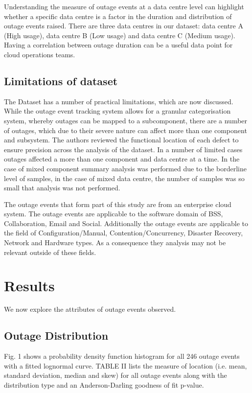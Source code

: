 \documentclass[conference]{IEEEtran}
\begin{document}
Understanding the measure of outage events at a data centre level can highlight whether a specific data centre is a factor in the duration and distribution of outage events raised. There are three data centres in our dataset: data centre A (High usage), data centre B (Low usage) and data centre C (Medium usage). Having a correlation between outage duration can be a useful data point for cloud operations teams.

\subsection{Limitations of dataset}

The Dataset has a number of practical limitations, which are now discussed. While the outage event tracking system allows for a granular categorisation system, whereby outages can be mapped to a subcomponent, there are a number of outages, which due to their severe nature can affect more than one component and subsystem. The authors reviewed the functional location of each defect to ensure precision across the analysis of the dataset. In a number of limited cases outages affected a more than  one component and data centre at a time. In the case of mixed component summary analysis was performed due to the borderline level of samples, in the case of mixed data centre, the number of samples was so small that analysis was not performed. \par

The outage events that form part of this study are from an enterprise cloud system. The outage events are applicable to the software domain of BSS, Collaboration, Email and Social. Additionally the outage events are applicable to the field of Configuration/Manual, Contention/Concurrency, Disaster Recovery, Network and Hardware types. As a consequence they analysis may not be relevant outside of these fields. 

\section{Results}

We now explore the attributes of outage events observed.

\subsection{Outage Distribution}

Fig. 1 shows a probability density function histogram for all 246 outage events with a fitted lognormal curve. 
TABLE II lists the measure of location (i.e. mean, standard deviation, median and skew) for all outage events along with the distribution type and an Anderson-Darling goodness of fit p-value.
\end{document}
